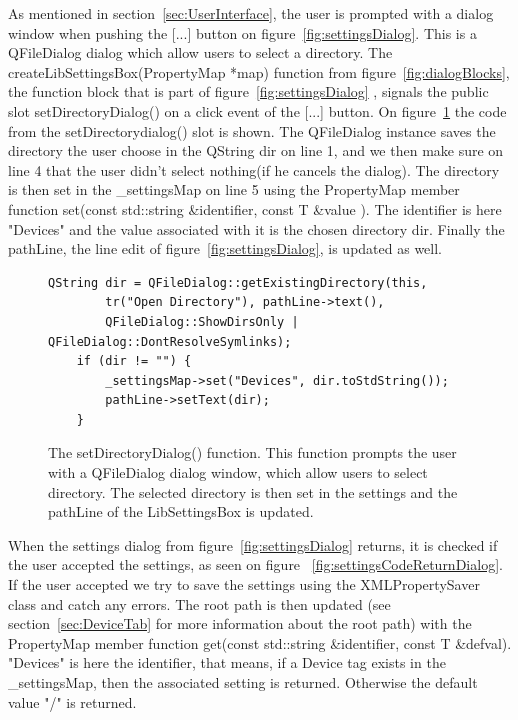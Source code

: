 As mentioned in section~\ref{sec:UserInterface}, the user is prompted with a dialog window when pushing the [...] button on figure~\ref{fig:settingsDialog}. This is a QFileDialog \cite{QtDocumentationQFileDialog} dialog which allow users to select a directory. The createLibSettingsBox(PropertyMap *map) function from figure~\ref{fig:dialogBlocks}, the function block that is part of figure~\ref{fig:settingsDialog} , signals the public slot setDirectoryDialog() on a click event of the [...] button. On figure~\ref{fig:settingsCodeQFileDialog} the code from the setDirectorydialog() slot is shown. The QFileDialog instance saves the directory the user choose in the QString dir on line 1, and we then make sure on line 4 that the user didn't select nothing(if he cancels the dialog). The directory is then set in the \_settingsMap on line 5 using the PropertyMap member function set(const std::string \&identifier, const T \&value ). The identifier is here "Devices" and the value associated with it is the chosen directory dir. Finally the pathLine, the line edit of figure~\ref{fig:settingsDialog}, is updated as well.

\begin{figure}[h] %
\centering
\lstset{language=C++} 
\begin{lstlisting}[frame=single]  
QString dir = QFileDialog::getExistingDirectory(this, 
		tr("Open Directory"), pathLine->text(),
	    QFileDialog::ShowDirsOnly | QFileDialog::DontResolveSymlinks);
    if (dir != "") {
        _settingsMap->set("Devices", dir.toStdString());
        pathLine->setText(dir);
    }
\end{lstlisting}
\caption{The setDirectoryDialog() function. This function prompts the user with a QFileDialog dialog window, which allow users to select directory. The selected directory is then set in the settings and the pathLine of the LibSettingsBox is updated.}
\label{fig:settingsCodeQFileDialog} 	
\end{figure}

When the settings dialog from figure~\ref{fig:settingsDialog} returns, it is checked if the user accepted the settings,  as seen on figure ~\ref{fig:settingsCodeReturnDialog}. If the user accepted we try to save the settings using the XMLPropertySaver \cite{XMLPropertySaver} class and catch any errors. The root path is then updated (see section~\ref{sec:DeviceTab} for more information about the root path) with the PropertyMap member function get(const std::string \&identifier, const T \&defval). "Devices" is here the identifier, that means, if a Device tag exists in the \_settingsMap, then the associated setting is returned. Otherwise the default value "/" is returned.

